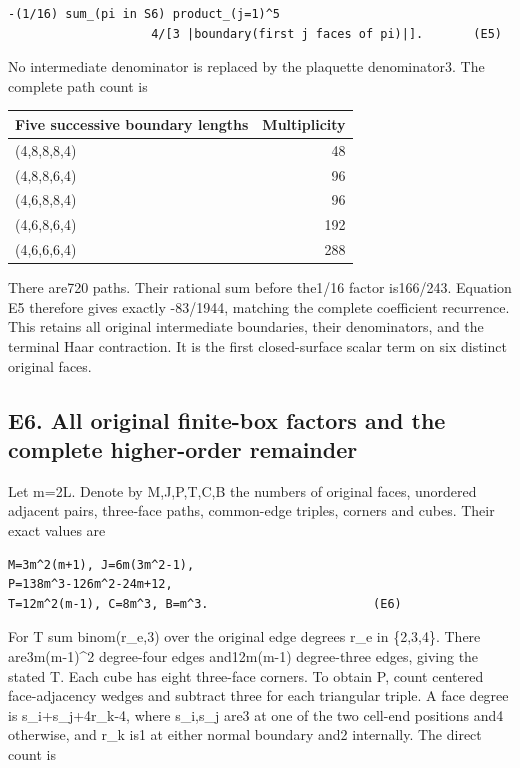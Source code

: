 \documentclass[11pt,a4paper]{article}
\newcounter{none}
\renewcommand{\[}{\begingroup\small\originaldisplaystart}
\renewcommand{\]}{\originaldisplayend\endgroup}
\begin{document}
\begin{verbatim}
-(1/16) sum_(pi in S6) product_(j=1)^5
                    4/[3 |boundary(first j faces of pi)|].       (E5)
\end{verbatim}

No intermediate denominator is replaced by the plaquette denominator3.
The complete path count is

{\def\LTcaptype{none} %
\begin{longtable}[]{@{}lr@{}}
\toprule\noalign{}
Five successive boundary lengths & Multiplicity \\
\midrule\noalign{}
\endhead
\bottomrule\noalign{}
\endlastfoot
(4,8,8,8,4) & 48 \\
(4,8,8,6,4) & 96 \\
(4,6,8,8,4) & 96 \\
(4,6,8,6,4) & 192 \\
(4,6,6,6,4) & 288 \\
\end{longtable}
}

There are720 paths. Their rational sum before the1/16 factor is166/243.
Equation E5 therefore gives exactly -83/1944, matching the complete
coefficient recurrence. This retains all original intermediate
boundaries, their denominators, and the terminal Haar contraction. It is
the first closed-surface scalar term on six distinct original faces.

\subsection{E6. All original finite-box factors and the complete
higher-order
remainder}\label{e6.-all-original-finite-box-factors-and-the-complete-higher-order-remainder}

Let m=2L. Denote by M,J,P,T,C,B the numbers of original faces, unordered
adjacent pairs, three-face paths, common-edge triples, corners and
cubes. Their exact values are

\begin{verbatim}
M=3m^2(m+1), J=6m(3m^2-1),
P=138m^3-126m^2-24m+12,
T=12m^2(m-1), C=8m^3, B=m^3.                       (E6)
\end{verbatim}

For T sum binom(r\_e,3) over the original edge degrees r\_e in
\{2,3,4\}. There are3m(m-1)\^{}2 degree-four edges and12m(m-1)
degree-three edges, giving the stated T. Each cube has eight three-face
corners. To obtain P, count centered face-adjacency wedges and subtract
three for each triangular triple. A face degree is s\_i+s\_j+4r\_k-4,
where s\_i,s\_j are3 at one of the two cell-end positions and4
otherwise, and r\_k is1 at either normal boundary and2 internally. The
direct count is
\end{document}
